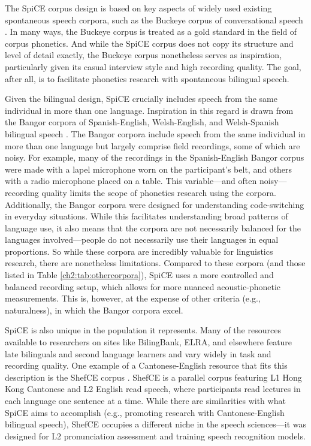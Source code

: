 The SpiCE corpus design is based on key aspects of widely used existing spontaneous speech corpora, such as the Buckeye corpus of conversational speech \citep{pitt_2005_buckeye}. In many ways, the Buckeye corpus is treated as a gold standard in the field of corpus phonetics. And while the SpiCE corpus does not copy its structure and level of detail exactly, the Buckeye corpus nonetheless serves as inspiration, particularly given its casual interview style and high recording quality. The goal, after all, is to facilitate phonetics research with spontaneous bilingual speech. 

Given the bilingual design, SpiCE crucially includes speech from the same individual in more than one language. Inspiration in this regard is drawn from the Bangor corpora of Spanish-English, Welsh-English, and Welsh-Spanish bilingual speech \citep{deuchar_2014_corpora}. The Bangor corpora include speech from the same individual in more than one language but largely comprise field recordings, some of which are noisy. For example, many of the recordings in the Spanish-English Bangor corpus were made with a lapel microphone worn on the participant's belt, and others with a radio microphone placed on a table. This variable---and often noisy---recording quality limits the scope of phonetics research using the corpora. Additionally, the Bangor corpora were designed for understanding code-switching in everyday situations. While this facilitates understanding broad patterns of language use, it also means that the corpora are not necessarily balanced for the languages involved---people do not necessarily use their languages in equal proportions. So while these corpora are incredibly valuable for linguistics research, there are nonetheless limitations. Compared to these corpora (and those listed in Table \ref{ch2:tab:othercorpora}), SpiCE uses a more controlled and balanced recording setup, which allows for more nuanced acoustic-phonetic measurements. This is, however, at the expense of other criteria (e.g., naturalness), in which the Bangor corpora excel.

SpiCE is also unique in the population it represents. Many of the resources available to researchers on sites like BilingBank, ELRA, and elsewhere feature late bilinguals and second language learners and vary widely in task and recording quality. One example of a Cantonese-English resource that fits this description is the ShefCE corpus \citep{ng_shefce_2017}. ShefCE is a parallel corpus featuring L1 Hong Kong Cantonese and L2 English read speech, where participants read lectures in each language one sentence at a time. While there are similarities with what SpiCE aims to accomplish (e.g., promoting research with Cantonese-English bilingual speech), ShefCE occupies a different niche in the speech sciences---it was designed for L2 pronunciation assessment and training speech recognition models.

